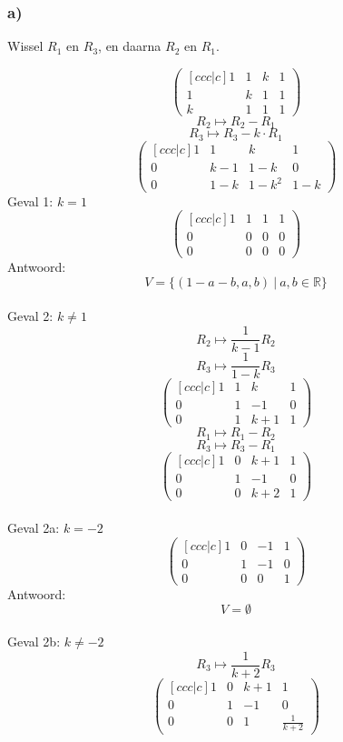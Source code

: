 \documentclass[lineaire_algebra_oplossingen.tex]{subfiles}
\begin{document}
\subsubsection*{a)}
\begin{center}
Wissel $R_1$ en $R_3$, en daarna $R_2$ en $R_1$.
\end{center}
\[
\begin{pmatrix}[ccc|c]
1 &  1 &  k & 1\\
1 &  k &  1 & 1\\
k &  1 &  1 & 1
\end{pmatrix}
\]
\[ R_2 \longmapsto R_2 - R_1\]
\[ R_3 \longmapsto R_3 - k \cdot	R_1\]
\[
\begin{pmatrix}[ccc|c]
1 &  1 &  k & 1\\
0 & k-1& 1-k& 0\\
0 & 1-k & 1-k^2 & 1-k
\end{pmatrix}
\]
Geval 1: $k=1$
\[
\begin{pmatrix}[ccc|c]
1 &  1 & 1 & 1\\
0 &  0 & 0 & 0\\
0 &  0 & 0 & 0
\end{pmatrix}
\]
Antwoord:
\[
V=\{ (1-a-b,a,b)\ |\ a,b \in \mathbb{R}\}
\]\\
Geval 2: $k\neq 1$\\ 
\[ R_2 \longmapsto \frac{1}{k-1}R_2\]
\[ R_3 \longmapsto \frac{1}{1-k}R_3\]
\[
\begin{pmatrix}[ccc|c]
1 &  1 &  k & 1\\
0 &  1 & -1 & 0\\
0 &  1 & k+1& 1
\end{pmatrix}
\]
\[ R_1 \longmapsto R_1-R_2\]
\[ R_3 \longmapsto R_3-R_1\]
\[
\begin{pmatrix}[ccc|c]
1 &  0 &  k+1 & 1\\
0 &  1 & -1 & 0\\
0 &  0 & k+2& 1
\end{pmatrix}
\]\\
Geval 2a: $k = -2$\\
\[
\begin{pmatrix}[ccc|c]
1 &  0 & -1 & 1\\
0 &  1 & -1 & 0\\
0 &  0 &  0 & 1
\end{pmatrix}
\]
Antwoord:
\[
V=\emptyset
\]\\
Geval 2b: $k\neq-2$\\
\[ R_3 \longmapsto \frac{1}{k+2}R_3\]
\[
\begin{pmatrix}[ccc|c]
1 &  0 &  k+1 & 1\\
0 &  1 & -1 & 0\\
0 &  0 &  1 & \frac{1}{k+2}
\end{pmatrix}
\]
\end{document}
